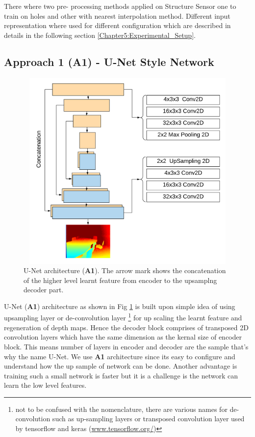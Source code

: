 There where two pre- processing methods applied on Structure Sensor one to train on holes and other with nearest interpolation method. Different input representation where used for different configuration which are described in details in the following section \ref{Chapter5:Experimental_Setup}.

\subsection{Approach 1 (A1) - U-Net Style Network}
\label{Chapter5:A1}
\begin{figure}[t]
    \centering
    \includegraphics[width = 12cm, height = 10cm]{Figures/A1.png}
    \caption{U-Net architecture (\textbf{A1}). The arrow mark shows the concatenation of the higher level learnt feature from encoder to the upsamplng decoder part.}
    \label{fig:A1-U-NetArchetecture}
\end{figure}{}

U-Net (\textbf{A1}) architecture as shown in Fig \ref{fig:A1-U-NetArchetecture} is built upon simple idea of using upsampling layer or de-convolution layer  \footnote{not to be confused with the nomenclature, there are various names for de-convolution such as up-sampling layers or transposed convolution layer used by tensorflow and keras (\url{www.tensorflow.org/})} for up scaling the learnt feature and regeneration of depth maps. Hence the decoder block comprises of transposed 2D convolution layers which have the same dimension as the kernal size of encoder block. This means number of layers in encoder and decoder are the sample that's why the name U-Net. We use \textbf{A1} architecture since its easy to configure and understand how the up sample of network can be done. Another advantage is training such a small network is faster but it is a challenge is the network can learn the low level features. 

